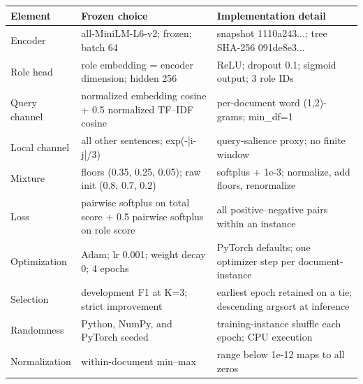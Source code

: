 \begin{tabular}{>{\raggedright\arraybackslash}p{}>{\raggedright\arraybackslash}p{}>{\raggedright\arraybackslash}p{}}
\toprule
Element & Frozen choice & Implementation detail \\
\midrule
Encoder & all-MiniLM-L6-v2; frozen; batch 64 & snapshot 1110a243...; tree SHA-256 091de8e3... \\
Role head & role embedding = encoder dimension; hidden 256 & ReLU; dropout 0.1; sigmoid output; 3 role IDs \\
Query channel & 0.5 normalized embedding cosine + 0.5 normalized TF--IDF cosine & per-document word (1,2)-grams; min\_df=1 \\
Local channel & all other sentences; exp(-|i-j|/3) & query-salience proxy; no finite window \\
Mixture & floors (0.35, 0.25, 0.05); raw init (0.8, 0.7, 0.2) & softplus + 1e-3; normalize, add floors, renormalize \\
Loss & pairwise softplus on total score + 0.5 pairwise softplus on role score & all positive--negative pairs within an instance \\
Optimization & Adam; lr 0.001; weight decay 0; 4 epochs & PyTorch defaults; one optimizer step per document-instance \\
Selection & development F1 at K=3; strict improvement & earliest epoch retained on a tie; descending argsort at inference \\
Randomness & Python, NumPy, and PyTorch seeded & training-instance shuffle each epoch; CPU execution \\
Normalization & within-document min--max & range below 1e-12 maps to all zeros \\
\bottomrule
\end{tabular}
